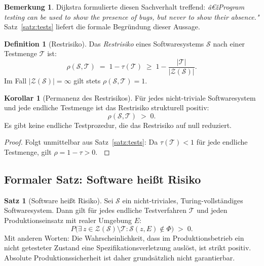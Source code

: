 ﻿\documentclass[a4paper,12pt]{article}
\theoremstyle{definition}
\newtheorem{definition}{Definition}
\newtheorem{satz}{Satz}
\newtheorem{bemerkung}{Bemerkung}
\newtheorem{korollar}{Korollar}
\newenvironment{beweis}{\begin{proof}}{\end{proof}}
\begin{document}
\begin{bemerkung}
    Dijkstra formulierte diesen Sachverhalt treffend: \emph{â€žProgram testing can be used
    to show the presence of bugs, but never to show their absence."} \cite{dijkstra1972}
    Satz~\ref{satz:tests} liefert die formale Begr\"undung dieser Aussage.
\end{bemerkung}

\begin{definition}[Restrisiko]
    Das \emph{Restrisiko} eines Softwaresystems $\mathcal{S}$ nach einer Testmenge
    $\mathcal{T}$ ist:
    \[
        \rho(\mathcal{S}, \mathcal{T}) \;=\; 1 - \tau(\mathcal{T}) \;\geq\; 1 - \frac{|\mathcal{T}|}{|\mathcal{Z}(\mathcal{S})|}.
    \]
    Im Fall $|\mathcal{Z}(\mathcal{S})| = \infty$ gilt stets $\rho(\mathcal{S}, \mathcal{T}) = 1$.
\end{definition}

\begin{korollar}[Permanenz des Restrisikos]
\label{kor:restrisiko}
    F\"ur jedes nicht-triviale Softwaresystem und jede endliche Testmenge ist das Restrisiko
    strukturell positiv:
    \[
        \rho(\mathcal{S}, \mathcal{T}) \;>\; 0.
    \]
    Es gibt keine endliche Testprozedur, die das Restrisiko auf null reduziert.
\end{korollar}

\begin{beweis}
    Folgt unmittelbar aus Satz~\ref{satz:tests}: Da $\tau(\mathcal{T}) < 1$ f\"ur jede
    endliche Testmenge, gilt $\rho = 1 - \tau > 0$. $\qedhere$
\end{beweis}

\subsection{Formaler Satz: Software heißt Risiko}

\begin{satz}[Software hei\ss{}t Risiko]
\label{satz:risiko}
    Sei $\mathcal{S}$ ein nicht-triviales, Turing-vollst\"andiges Softwaresystem.
    Dann gilt f\"ur jedes endliche Testverfahren $\mathcal{T}$ und jeden
    Produktionseinsatz mit realer Umgebung $E$:
    \[
        P\bigl(\exists\, z \in \mathcal{Z}(\mathcal{S}) \setminus \mathcal{T} \colon
        \mathcal{S}(z, E) \notin \Phi\bigr) \;>\; 0.
    \]
    Mit anderen Worten: Die Wahrscheinlichkeit, dass im Produktionsbetrieb ein nicht
    getesteter Zustand eine Spezifikationsverletzung ausl\"ost, ist strikt positiv.
    Absolute Produktionssicherheit ist daher grunds\"atzlich nicht garantierbar.
\end{satz}
\end{document}
